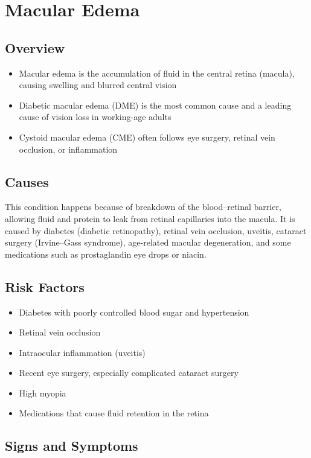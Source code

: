 \chapter{Macular Edema}
\label{sec:Macular Edema}

\section{Overview}
\begin{itemize}[noitemsep]
  \item Macular edema is the accumulation of fluid in the central retina (macula), causing swelling and blurred central vision
  \item Diabetic macular edema (DME) is the most common cause and a leading cause of vision loss in working-age adults
  \item Cystoid macular edema (CME) often follows eye surgery, retinal vein occlusion, or inflammation
\end{itemize}
\section{Causes}
This condition happens because of breakdown of the blood--retinal barrier, allowing fluid and protein to leak from retinal capillaries into the macula. It is caused by diabetes (diabetic retinopathy), retinal vein occlusion, uveitis, cataract surgery (Irvine--Gass syndrome), age-related macular degeneration, and some medications such as prostaglandin eye drops or niacin.
\section{Risk Factors}
\begin{itemize}[noitemsep]
  \item Diabetes with poorly controlled blood sugar and hypertension
  \item Retinal vein occlusion
  \item Intraocular inflammation (uveitis)
  \item Recent eye surgery, especially complicated cataract surgery
  \item High myopia
  \item Medications that cause fluid retention in the retina
\end{itemize}
\section{Signs and Symptoms}

